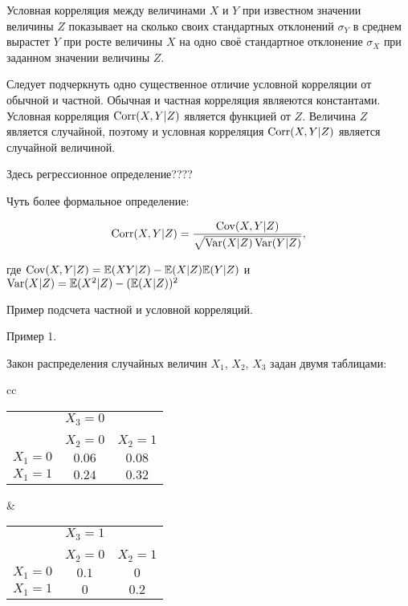 \documentclass[10pt]{article}
\begin{document}
\begin{definition}
Условная корреляция между величинами $X$ и $Y$ при известном значении величины $Z$ показывает на сколько своих стандартных отклонений $\sigma_Y$ в среднем вырастет $Y$ при росте величины $X$ на одно своё стандартное отклонение $\sigma_X$ при заданном значении величины $Z$.
\end{definition}


Следует подчеркнуть одно существенное отличие условной корреляции от обычной и частной. Обычная и частная корреляция являеются константами. Условная корреляция $\operatorname{Corr}(X,Y|Z)$ является функцией от $Z$. Величина $Z$ является случайной, поэтому и условная корреляция $\operatorname{Corr}(X,Y|Z)$ является случайной величиной. 

Здесь регрессионное определение???? 

Чуть более формальное определение:

\begin{definition}
\[
\operatorname{Corr}(X,Y|Z) = \frac{\operatorname{Cov}(X,Y|Z)}{\sqrt{\operatorname{Var}(X|Z)\operatorname{Var}(Y|Z)}},
\]
\end{definition}

где $\operatorname{Cov}(X,Y|Z)=\mathbb{E}(XY|Z)-\mathbb{E}(X|Z)\mathbb{E}(Y|Z)$ и $\operatorname{Var}(X|Z)=\mathbb{E}(X^2|Z)-(\mathbb{E}(X|Z))^2$


Пример подсчета частной и условной корреляций.

Пример 1.

Закон распределения случайных величин $X_1$, $X_2$, $X_3$ задан двумя таблицами:

\begin{center}
\begin{tabular}{cc}
\begin{tabular}{ccc}
& $X_3=0$ &    \\
& & \\
\cline{1-3}
 & $X_2=0$ & $X_2=1$ \\
\cline{1-3}
$X_1=0$ & $0.06$ & $0.08$ \\
$X_1=1$ & $0.24$ & $0.32$  \\
\end{tabular}
&
\begin{tabular}{ccc}
& $X_3=1$ &    \\
& & \\
\cline{1-3}
 & $X_2=0$ & $X_2=1$ \\
\cline{1-3}
$X_1=0$ & $0.1$ & $0$ \\
$X_1=1$ & $0$ & $0.2$ \\
\end{tabular}
\end{tabular}
\end{center}
\end{document}
